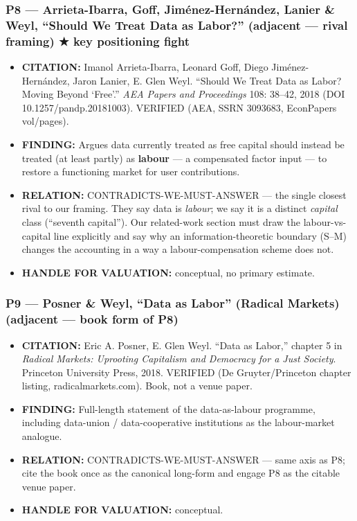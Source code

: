 \documentclass[
  11pt,
]{article}
\providecommand{\tightlist}{%
  \setlength{\itemsep}{0pt}\setlength{\parskip}{0pt}}
\begin{document}
\subsubsection{P8 --- Arrieta-Ibarra, Goff, Jiménez-Hernández, Lanier \&
Weyl, ``Should We Treat Data as Labor?'' (adjacent --- rival framing) ★
key positioning
fight}\label{p8-arrieta-ibarra-goff-jimuxe9nez-hernuxe1ndez-lanier-weyl-should-we-treat-data-as-labor-adjacent-rival-framing-key-positioning-fight}

\begin{itemize}
\tightlist
\item
  \textbf{CITATION:} Imanol Arrieta-Ibarra, Leonard Goff, Diego
  Jiménez-Hernández, Jaron Lanier, E. Glen Weyl. ``Should We Treat Data
  as Labor? Moving Beyond `Free'.'' \emph{AEA Papers and Proceedings}
  108: 38--42, 2018 (DOI 10.1257/pandp.20181003). VERIFIED (AEA, SSRN
  3093683, EconPapers vol/pages).
\item
  \textbf{FINDING:} Argues data currently treated as free capital should
  instead be treated (at least partly) as \textbf{labour} --- a
  compensated factor input --- to restore a functioning market for user
  contributions.
\item
  \textbf{RELATION:} CONTRADICTS-WE-MUST-ANSWER --- the single closest
  rival to our framing. They say data is \emph{labour}; we say it is a
  distinct \emph{capital} class (``seventh capital''). Our related-work
  section must draw the labour-vs-capital line explicitly and say why an
  information-theoretic boundary (S--M) changes the accounting in a way
  a labour-compensation scheme does not.
\item
  \textbf{HANDLE FOR VALUATION:} conceptual, no primary estimate.
\end{itemize}

\subsubsection{P9 --- Posner \& Weyl, ``Data as Labor'' (Radical
Markets) (adjacent --- book form of
P8)}\label{p9-posner-weyl-data-as-labor-radical-markets-adjacent-book-form-of-p8}

\begin{itemize}
\tightlist
\item
  \textbf{CITATION:} Eric A. Posner, E. Glen Weyl. ``Data as Labor,''
  chapter 5 in \emph{Radical Markets: Uprooting Capitalism and Democracy
  for a Just Society}. Princeton University Press, 2018. VERIFIED (De
  Gruyter/Princeton chapter listing, radicalmarkets.com). Book, not a
  venue paper.
\item
  \textbf{FINDING:} Full-length statement of the data-as-labour
  programme, including data-union / data-cooperative institutions as the
  labour-market analogue.
\item
  \textbf{RELATION:} CONTRADICTS-WE-MUST-ANSWER --- same axis as P8;
  cite the book once as the canonical long-form and engage P8 as the
  citable venue paper.
\item
  \textbf{HANDLE FOR VALUATION:} conceptual.
\end{itemize}
\end{document}
